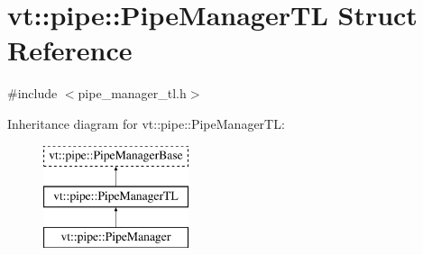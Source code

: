 \hypertarget{structvt_1_1pipe_1_1_pipe_manager_t_l}{}\section{vt\+:\+:pipe\+:\+:Pipe\+Manager\+TL Struct Reference}
\label{structvt_1_1pipe_1_1_pipe_manager_t_l}


{\ttfamily \#include $<$pipe\+\_\+manager\+\_\+tl.\+h$>$}

Inheritance diagram for vt\+:\+:pipe\+:\+:Pipe\+Manager\+TL\+:\begin{figure}[H]
\begin{center}
\leavevmode
\includegraphics[height=3.000000cm]{structvt_1_1pipe_1_1_pipe_manager_t_l}
\end{center}
\end{figure}
